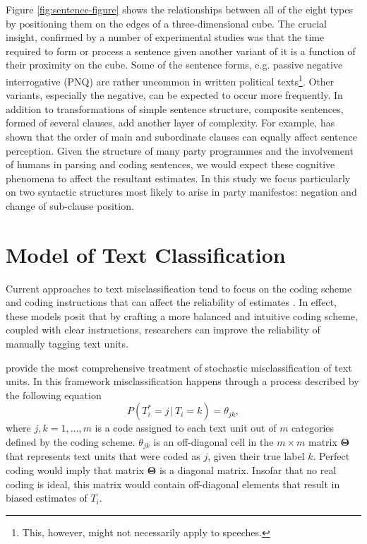 \documentclass[a4paper, 12pt]{article}
\begin{document}
Figure \ref{fig:sentence-figure} shows the relationships between all of the eight types by positioning them on the edges of a three-dimensional cube. The crucial insight, confirmed by a number of experimental studies \citep{Gough1965, Mehler1963} was that the time required to form or process a sentence given another variant of it is a function of their proximity on the cube. Some of the sentence forms, e.g. passive negative interrogative (PNQ) are rather uncommon in written political texts\footnote{This, however, might not necessarily apply to speeches.}. Other variants, especially the negative, can be expected to occur more frequently. In addition to transformations of simple sentence structure, composite sentences, formed of several clauses, add another layer of complexity. For example, \citet{Holmes1973} has shown that the order of main and subordinate clauses can equally affect sentence perception. Given the structure of many party programmes and the involvement of humans in parsing and coding sentences, we would expect these cognitive phenomena to affect the resultant estimates. In this study we focus particularly on two syntactic structures most likely to arise in party manifestos: negation and change of sub-clause position.

\section{Model of Text Classification}
Current approaches to text misclassification tend to focus on the coding scheme and coding instructions that can affect the reliability of estimates \citep{Krippendorff2004}. In effect, these models posit that by crafting a more balanced and intuitive coding scheme, coupled with clear instructions, researchers can improve the reliability of manually tagging text units.

\citet{Mikhaylov2012} provide the most comprehensive treatment of stochastic misclassification of text units. In this framework misclassification happens through a process described by the following equation
\begin{equation*}
  P(T^*_i = j\,|\,T_i = k) = \theta_{jk},
\end{equation*}
where $j, k = 1, ..., m$ is a code assigned to each text unit out of $m$ categories defined by the coding scheme. $\theta_{jk}$ is an off-diagonal cell in the $m \times m$ matrix $\bm{\Theta}$ that represents text units that were coded as $j$, given their true label $k$. Perfect coding would imply that matrix $\bm{\Theta}$ is a diagonal matrix. Insofar that no real coding is ideal, this matrix would contain off-diagonal elements that result in biased estimates of $T_i$.
\end{document}
